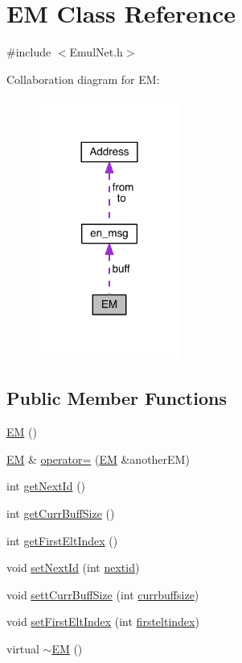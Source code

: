 \hypertarget{class_e_m}{}\section{E\+M Class Reference}
\label{class_e_m}


{\ttfamily \#include $<$Emul\+Net.\+h$>$}



Collaboration diagram for E\+M\+:\nopagebreak
\begin{figure}[H]
\begin{center}
\leavevmode
\includegraphics[width=132pt]{d2/d19/class_e_m__coll__graph}
\end{center}
\end{figure}
\subsection*{Public Member Functions}
\begin{DoxyCompactItemize}
\item 
\hyperlink{class_e_m_ab63fb999a41e57947ecd2e61c073c5ef}{E\+M} ()
\item 
\hyperlink{class_e_m}{E\+M} \& \hyperlink{class_e_m_a5d8a513e96af2ea0effeed5efb0ac658}{operator=} (\hyperlink{class_e_m}{E\+M} \&another\+E\+M)
\item 
int \hyperlink{class_e_m_a1b212e3582198f87702f208663d2a001}{get\+Next\+Id} ()
\item 
int \hyperlink{class_e_m_a5594e7c089507bbad73044c2cbb36aea}{get\+Curr\+Buff\+Size} ()
\item 
int \hyperlink{class_e_m_a901bb3d251f1944d2bb56538006036c5}{get\+First\+Elt\+Index} ()
\item 
void \hyperlink{class_e_m_a11bfe493228a27be761405adcecbf942}{set\+Next\+Id} (int \hyperlink{class_e_m_abe82d3a166960b6c717b29111e337ada}{nextid})
\item 
void \hyperlink{class_e_m_a04735702f4943bd77292f2fb8d8b5a7d}{sett\+Curr\+Buff\+Size} (int \hyperlink{class_e_m_a8199bc20a63a93126b276a1d968ca72c}{currbuffsize})
\item 
void \hyperlink{class_e_m_a6fbcaa7e821bbd0e7285b389ccf9397e}{set\+First\+Elt\+Index} (int \hyperlink{class_e_m_a7c7dfed53d8ee4b28b738f8a4dc47424}{firsteltindex})
\item 
virtual \hyperlink{class_e_m_a9d270b3946c58c5e536ba7e20034b98e}{$\sim$\+E\+M} ()
\end{DoxyCompactItemize}
